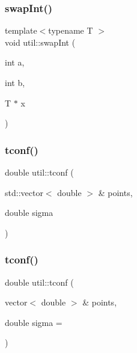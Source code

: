 \mbox{\label{namespaceutil_a998845d03758baa45e52b967cf230b01}} 
\subsubsection{\texorpdfstring{swap\+Int()}{swapInt()}\hspace{0.1cm}{\footnotesize\ttfamily [2/2]}}
{\footnotesize\ttfamily template$<$typename T $>$ \\
void util\+::swap\+Int (\begin{DoxyParamCaption}\item[{int}]{a,  }\item[{int}]{b,  }\item[{T $\ast$}]{x }\end{DoxyParamCaption})}

\mbox{\label{namespaceutil_a0b673442b1c87f0daf8bb0a4179a6834}} 
\subsubsection{\texorpdfstring{tconf()}{tconf()}\hspace{0.1cm}{\footnotesize\ttfamily [1/2]}}
{\footnotesize\ttfamily double util\+::tconf (\begin{DoxyParamCaption}\item[{std\+::vector$<$ double $>$ \&}]{points,  }\item[{double}]{sigma }\end{DoxyParamCaption})}

\mbox{\label{namespaceutil_a68758b62ab028fd0a2f0afb6d516be6f}} 
\subsubsection{\texorpdfstring{tconf()}{tconf()}\hspace{0.1cm}{\footnotesize\ttfamily [2/2]}}
{\footnotesize\ttfamily double util\+::tconf (\begin{DoxyParamCaption}\item[{vector$<$ double $>$ \&}]{points,  }\item[{double}]{sigma = {} }\end{DoxyParamCaption})}

